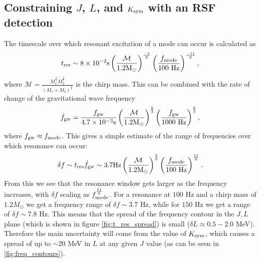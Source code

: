 \documentclass[fleqn,usenatbib]{mnras}
\begin{document}
\subsection{Constraining $J$, $L$, and $K_{\rm sym}$ with an RSF detection}
\hspace{\parindent}The timescale over which resonant excitation of a mode can occur is calculated as \cite{tsang2012resonant}
\begin{align}
t_{\rm res}\sim 8\times10^{-2}\text{s}\left(\frac{\mathcal{M}}{1.2\text{M}_{\odot}}\right)^{\frac{-5}{6}}\left(\frac{f_{\rm mode}}{100 \text{ Hz}}\right)^{\frac{-11}{6}},
\label{res_timescale}    
\end{align}
\noindent where $\mathcal{M}=\frac{M_1^{\frac{3}{5}}M_2^{\frac{3}{5}}}{(M_1+M_2)^{\frac{1}{5}}}$ is the chirp mass. This can be combined with the rate of change of the gravitational wave frequency
\begin{align}
\Dot{f}_{\rm gw}=\frac{f_{\rm gw}}{4.7\times10^{-3}\text{s}}\left(\frac{\mathcal{M}}{1.2\text{M}_{\odot}}\right)^{\frac{5}{3}}\left(\frac{f_{\rm gw}}{1000 \text{ Hz}}\right)^{\frac{8}{3}},
\label{res_timescale}    
\end{align}
\noindent where $f_{\rm gw}\approx f_{\rm mode}$. This gives a simple estimate of the range of frequencies over which resonance can occur:
\begin{align}
\delta f\sim t_{\rm res}\Dot{f}_{\rm gw}\sim3.7\text{Hz}\left(\frac{\mathcal{M}}{1.2\text{M}_{\odot}}\right)^{\frac{5}{6}}\left(\frac{f_{\rm mode}}{100 \text{ Hz}}\right)^{\frac{11}{6}}.
\label{res_timescale}    
\end{align}
\noindent From this we see that the resonance window gets larger as the frequency increases, with $\delta f$ scaling as $f_{\rm mode}^{\frac{11}{6}}$. For a resonance at $100$ Hz and a chirp mass of $1.2M_{\odot}$ we get a frequency range of $\delta f\sim 3.7$ Hz, while for $150$ Hz we get a range of $\delta f\sim 7.8$ Hz. This means that the spread of the frequency contour in the $J,L$ plane (which is shown in figure \ref{fig:t_res_spread}) is small ($\delta L\approx 0.5-2.0$ MeV). Therefore the main uncertainty will come from the value of $K_{\rm sym}$, which causes a spread of up to $\sim 20$ MeV in $L$ at any given $J$ value (as can be seen in \ref{fig:freq_contours}).
\end{document}
